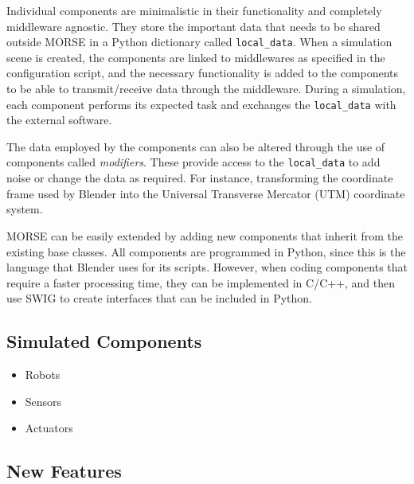 \documentclass{llncs}
\begin{document}
Individual components are minimalistic in their functionality and  completely
middleware agnostic. They store the important data that needs to be shared
outside MORSE in a Python dictionary called \texttt{local\_data}. When a
simulation scene is created, the components are linked to middlewares as
specified in the configuration script, and the necessary functionality is added
to the components to be able to transmit/receive data through the middleware.
During a simulation, each component performs its expected task and exchanges
the \texttt{local\_data} with the external software.

The data employed by the components can also be altered through the use of
components called \emph{modifiers}. These provide access to the
\texttt{local\_data} to add noise or change the data as required. For instance,
transforming the coordinate frame used by Blender into the Universal Transverse
Mercator (UTM) coordinate system.

MORSE can be easily extended by adding new components that inherit from the
existing base classes. All components are programmed in Python, since this is
the language that Blender uses for its scripts. However, when coding components
that require a faster processing time, they can be implemented in C/C++, and
then use SWIG to create interfaces that can be included in Python.

\subsection{Simulated Components}
\label{section:components}

\begin{itemize}
  \item Robots
  \item Sensors
  \item Actuators
\end{itemize}

\subsection{New Features}
\end{document}
